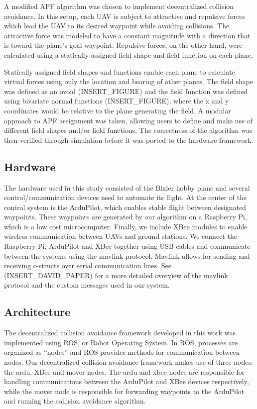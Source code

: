 \documentclass[conference]{IEEEtran}
\begin{document}
A modified APF algorithm was chosen to implement decentralized collision avoidance.  In this setup, each UAV is subject to attractive and repulsive forces which lead the UAV to its desired waypoint while avoiding collisions. The attractive force was modeled to have a constant magnitude with a direction that is toward the plane’s goal waypoint. Repulsive forces, on the other hand, were calculated using a statically assigned field shape and field function on each plane. 

Statically assigned field shapes and functions enable each plane to calculate virtual forces using only the location and bearing of other planes.  The field shape was defined as an ovoid (INSERT\_FIGURE) and the field function was defined using bivariate normal functions (INSERT\_FIGURE), where the x and y coordinates would be relative to the plane generating the field.  A modular approach to APF assignment was taken, allowing users to define and make use of different field shapes and/or field functions. The correctness of the algorithm was then verified through simulation before it was ported to the hardware framework.


\subsection{Hardware}

The hardware used in this study consisted of the Bixler hobby plane and several control/communication devices used to automate its flight.  At the center of the control system is the ArduPilot, which enables stable flight between designated waypoints.  These waypoints are generated by our algorithm on a Raspberry Pi, which is a low cost microcomputer. Finally, we include XBee modules to enable wireless communication between UAVs and ground stations.  We connect the Raspberry Pi, ArduPilot and XBee  together using USB cables and communicate between the systems using the mavlink protocol.  Mavlink allows for sending and receiving c-structs over serial communication lines. See (INSERT\_DAVID\_PAPER) for a more detailed overview of the mavlink protocol and the custom messages used in our system.

\subsection{Architecture}

The decentralized collision avoidance framework developed in this work was implemented using ROS, or Robot Operating System. In ROS, processes are organized as “nodes” and ROS provides methods for communication between nodes.   Our decentralized collision avoidance framework makes use of three nodes: the ardu, XBee and mover nodes.  The ardu and xbee nodes are responsible for handling communications between the ArduPilot and XBee devices respectively, while the mover node is responsible for forwarding waypoints to the ArduPilot and running the collision avoidance algorithm.  
\end{document}
